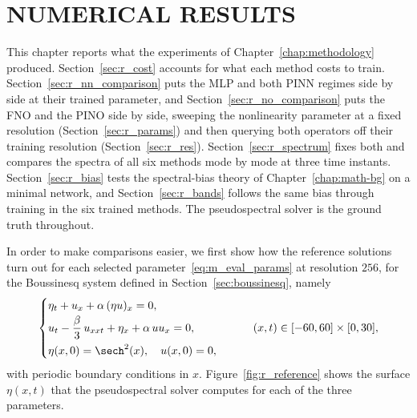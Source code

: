 \chapter{NUMERICAL RESULTS}
\label{chap:results}

This chapter reports what the experiments of Chapter~\ref{chap:methodology} produced. Section~\ref{sec:r_cost} accounts for what each method costs to train. Section~\ref{sec:r_nn_comparison} puts the MLP and both PINN regimes side by side at their trained parameter, and Section~\ref{sec:r_no_comparison} puts the FNO and the PINO side by side, sweeping the nonlinearity parameter at a fixed resolution (Section~\ref{sec:r_params}) and then querying both operators off their training resolution (Section~\ref{sec:r_res}). Section~\ref{sec:r_spectrum} fixes both and compares the spectra of all six methods mode by mode at three time instants. Section~\ref{sec:r_bias} tests the spectral-bias theory of Chapter~\ref{chap:math-bg} on a minimal network, and Section~\ref{sec:r_bands} follows the same bias through training in the six trained methods. The pseudospectral solver is the ground truth throughout.

In order to make comparisons easier, we first show how the reference solutions turn out for each selected parameter~\eqref{eq:m_eval_params} at resolution $256$, for the Boussinesq system defined in Section~\ref{sec:boussinesq}, namely
\begin{equation}\label{eq:r_ivp}
    \begin{cases}
        \eta_t + u_x + \alpha\,(\eta u)_x = 0, \\[2pt]
        u_t - \dfrac{\beta}{3}\,u_{xxt} + \eta_x + \alpha\,u u_x = 0, \\[6pt]
        \eta(x,0) = \sech^2(x), \quad u(x,0) = 0,
    \end{cases}
    \qquad (x,t) \in [-60, 60] \times [0, 30],
\end{equation}
with periodic boundary conditions in $x$. Figure~\ref{fig:r_reference} shows the surface $\eta(x,t)$ that the pseudospectral solver computes for each of the three parameters.

